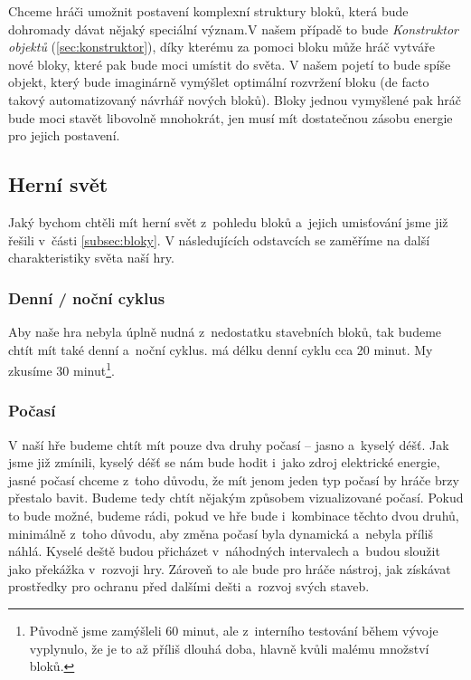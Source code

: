 Chceme hráči umožnit postavení komplexní struktury bloků, která bude dohromady dávat nějaký speciální význam.V našem případě to bude \textit{Konstruktor objektů} (\ref{sec:konstruktor}), díky kterému za pomoci bloku  může hráč vytváře nové bloky, které pak bude moci umístit do světa. V našem pojetí to bude spíše objekt, který bude imaginárně vymýšlet optimální rozvržení bloku (de facto takový automatizovaný návrhář nových bloků). Bloky jednou vymyšlené pak hráč bude moci stavět libovolně mnohokrát, jen musí mít dostatečnou zásobu energie pro jejich postavení.

\subsection{Herní svět}

Jaký bychom chtěli mít herní svět z~pohledu bloků a~jejich umisťování jsme již řešili v~části \ref{subsec:bloky}. V následujících odstavcích se zaměříme na další charakteristiky světa naší hry.

\subsubsection{Denní / noční cyklus}
Aby naše hra nebyla úplně nudná z~nedostatku stavebních bloků, tak budeme chtít mít také denní a~noční cyklus. \MC{} má délku denní cyklu cca 20 minut. My zkusíme 30 minut\footnote{Původně jsme zamýšleli 60 minut, ale z~interního testování během vývoje vyplynulo, že je to až příliš dlouhá doba, hlavně kvůli malému množství bloků.}.

\subsubsection{Počasí}

V naší hře budeme chtít mít pouze dva druhy počasí -- jasno a~kyselý déšť. Jak jsme již zmínili, kyselý déšť se nám bude hodit i~jako zdroj elektrické energie, jasné počasí chceme z~toho důvodu, že mít jenom jeden typ počasí by hráče brzy přestalo bavit. Budeme tedy chtít nějakým způsobem vizualizované počasí. Pokud to bude možné, budeme rádi, pokud ve hře bude i~kombinace těchto dvou druhů, minimálně z~toho důvodu, aby změna počasí byla dynamická a~nebyla příliš náhlá. Kyselé deště budou přicházet v~náhodných intervalech a~budou sloužit jako překážka v~rozvoji hry. Zároveň to ale bude pro hráče nástroj, jak získávat prostředky pro ochranu před dalšími dešti a~rozvoj svých staveb. 

